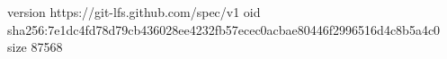 version https://git-lfs.github.com/spec/v1
oid sha256:7e1dc4fd78d79cb436028ee4232fb57ecec0acbae80446f2996516d4c8b5a4c0
size 87568
